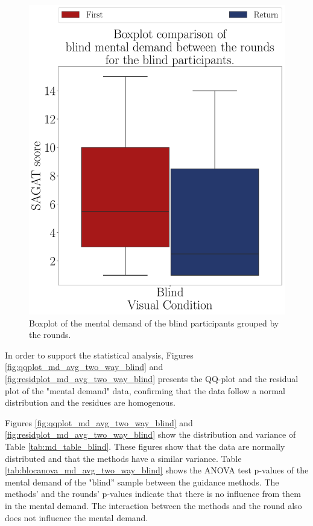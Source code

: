 \begin{figure}[!htb]
    \begin{minipage}{0.075\textwidth}
        \hfill
    \end{minipage}
    \begin{minipage}{0.45\textwidth}
        \centering
        \includegraphics[width = \textwidth]{Resultados/Nasa/Figuras/pdf/boxplot_md_blind_rounds.pdf}
        \caption{Boxplot of the mental demand of the blind participants grouped by the rounds.}
        \label{fig:boxplot_md_blind_rounds}
    \end{minipage}
\end{figure}

In order to support the statistical analysis, Figures \ref{fig:qqplot_md_avg_two_way_blind} and \ref{fig:residplot_md_avg_two_way_blind} presents the QQ-plot and the residual plot of the "mental demand" data, confirming that the data follow a normal distribution and the residues are homogenous.

Figures \ref{fig:qqplot_md_avg_two_way_blind} and \ref{fig:residplot_md_avg_two_way_blind} show the distribution and variance of Table \ref{tab:md_table_blind}. These figures show that the data are normally distributed and that the methods have a similar variance. Table \ref{tab:blocanova_md_avg_two_way_blind} shows the ANOVA test p-values of the mental demand of the "blind” sample between the guidance methods. The methods' and the rounds' p-values indicate that there is no influence from them in the mental demand. The interaction between the methods and the round also does not influence the mental demand.

